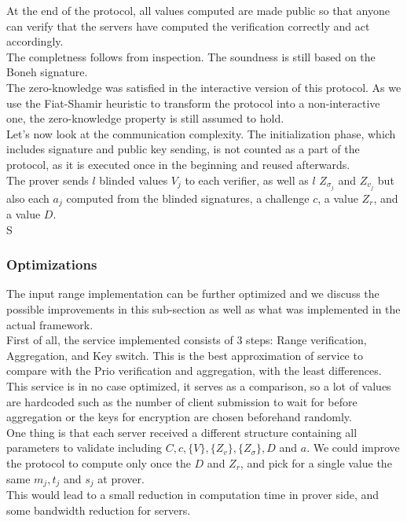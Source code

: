 \documentclass{article}
\begin{document}
At the end of the protocol, all values computed are made public so that anyone can verify that the servers have computed the verification correctly and act accordingly.\\

The completness follows from inspection. The soundness is still based on the Boneh signature.\\
The zero-knowledge was satisfied in the interactive version of this protocol. As we use the Fiat-Shamir heuristic \cite{fiatshamir} to transform the protocol into a  non-interactive one, the zero-knowledge property is still assumed to hold.\\

Let's now look at the communication complexity.
The initialization phase, which includes signature and public key sending, is not counted as a part of the protocol, as it is executed once in the beginning and reused afterwards.\\
The prover sends $l$ blinded values $V_j$ to each verifier, as well as $l$ $Z_{\sigma_j}$ and $Z_{v_j}$ but also each $a_j$ computed from the blinded signatures, a challenge $c$, a value $Z_r$, and a value $D$.\\
S


\subsubsection*{Optimizations}
The input range implementation can be further optimized and we discuss the possible improvements in this sub-section as well as what was implemented in the actual framework.\\
First of all, the service implemented consists of 3 steps: Range verification, Aggregation, and Key switch. This is the best approximation of service to compare with the Prio verification and aggregation, with the least differences.\\
This service is in no case optimized, it serves as a comparison, so a lot of values are hardcoded such as the number of client submission to wait for before aggregation or the keys for encryption are chosen beforehand randomly.\\

One thing is that each server received a different structure containing all parameters to validate including $C, c, \{V\}, \{Z_v\} ,\{ Z_{\sigma}\}, D $ and $a$. We could improve the protocol to compute only once the $D$ and $Z_r$, and pick for a single value the same $m_j, t_j$ and $s_j$ at prover.\\
This would lead to a small reduction in computation time in prover side, and some bandwidth reduction for servers.
\end{document}

